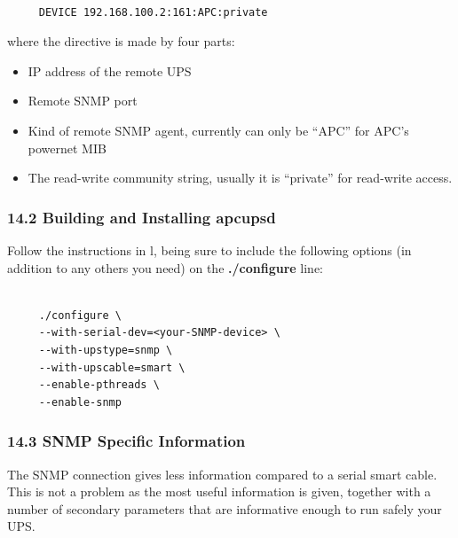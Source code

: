 \footnotesize
\begin{verbatim}
     
     DEVICE 192.168.100.2:161:APC:private
\end{verbatim}
\normalsize

where the directive is made by four parts:  

\begin{itemize}
\item IP address of the remote UPS  
\item Remote SNMP port  
\item Kind of remote SNMP agent, currently can only be ``APC'' for APC's
powernet MIB  
\item The read-write community string, usually it is ``private'' for
read-write access. 
\end{itemize}

\label{Building-and-Installing-apcupsd-_003c1_003e}

\subsubsection*{14.2 Building and Installing apcupsd}

Follow the instructions in 
l, being sure to include
the following options (in addition to any others you need) on the {\bf
./configure} line: 

\footnotesize
\begin{verbatim}
     
     ./configure \
     --with-serial-dev=<your-SNMP-device> \
     --with-upstype=snmp \
     --with-upscable=smart \
     --enable-pthreads \
     --enable-snmp
\end{verbatim}
\normalsize

\label{SNMP-Specific-Information}

\subsubsection*{14.3 SNMP Specific Information}

\label{index-SNMP-164}
The SNMP connection gives less information compared to a serial smart cable.
This is not a problem as the most useful information is given, together with a
number of secondary parameters that are informative enough to run safely your
UPS. 


